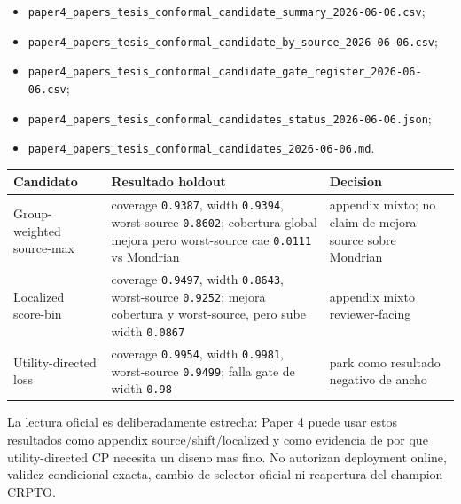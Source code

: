 \documentclass[
  spanish,
  11pt,
  letterpaper,
]{scrbook}
\newcounter{none} %
\providecommand{\tightlist}{%
  \setlength{\itemsep}{0pt}\setlength{\parskip}{0pt}}
\theoremstyle{plain}
\theoremstyle{remark}
\begin{document}
\begin{itemize}
\tightlist
\item
  \texttt{paper4\_papers\_tesis\_conformal\_candidate\_summary\_2026-06-06.csv};
\item
  \texttt{paper4\_papers\_tesis\_conformal\_candidate\_by\_source\_2026-06-06.csv};
\item
  \texttt{paper4\_papers\_tesis\_conformal\_candidate\_gate\_register\_2026-06-06.csv};
\item
  \texttt{paper4\_papers\_tesis\_conformal\_candidates\_status\_2026-06-06.json};
\item
  \texttt{paper4\_papers\_tesis\_conformal\_candidates\_2026-06-06.md}.
\end{itemize}

{\def\LTcaptype{none} %
\begin{longtable}[]{@{}
  >{\raggedright\arraybackslash}p{}
  >{\raggedright\arraybackslash}p{}
  >{\raggedright\arraybackslash}p{}@{}}
\toprule\noalign{}
\begin{minipage}[b]{\linewidth}\raggedright
Candidato
\end{minipage} & \begin{minipage}[b]{\linewidth}\raggedright
Resultado holdout
\end{minipage} & \begin{minipage}[b]{\linewidth}\raggedright
Decision
\end{minipage} \\
\midrule\noalign{}
\endhead
\bottomrule\noalign{}
\endlastfoot
Group-weighted source-max & coverage \texttt{0.9387}, width
\texttt{0.9394}, worst-source \texttt{0.8602}; cobertura global mejora
pero worst-source cae \texttt{0.0111} vs Mondrian & appendix mixto; no
claim de mejora source sobre Mondrian \\
Localized score-bin & coverage \texttt{0.9497}, width \texttt{0.8643},
worst-source \texttt{0.9252}; mejora cobertura y worst-source, pero sube
width \texttt{0.0867} & appendix mixto reviewer-facing \\
Utility-directed loss & coverage \texttt{0.9954}, width \texttt{0.9981},
worst-source \texttt{0.9499}; falla gate de width \texttt{0.98} & park
como resultado negativo de ancho \\
\end{longtable}
}

La lectura oficial es deliberadamente estrecha: Paper 4 puede usar estos
resultados como appendix source/shift/localized y como evidencia de por
que utility-directed CP necesita un diseno mas fino. No autorizan
deployment online, validez condicional exacta, cambio de selector
oficial ni reapertura del champion CRPTO.
\end{document}
